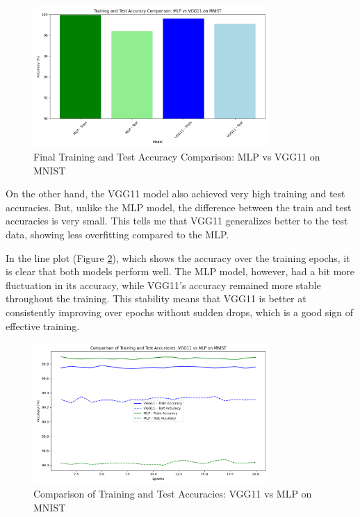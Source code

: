 \documentclass[10pt,letter,notitlepage]{article}
\begin{document}
\begin{center}
\begin{figure}[H]
    \centering
    \includegraphics[width=0.8\textwidth]{mlp_vs_vgg11_train_test_accuracy_comparison.png}
    \caption{Final Training and Test Accuracy Comparison: MLP vs VGG11 on MNIST}
    \label{fig:mlp_vgg11_comparison}
\end{figure}

On the other hand, the VGG11 model also achieved very high training and test accuracies. But, unlike the MLP model, the difference between the train and test accuracies is very small. This tells me that VGG11 generalizes better to the test data, showing less overfitting compared to the MLP.

In the line plot (Figure \ref{fig:vgg11_mlp_accuracy}), which shows the accuracy over the training epochs, it is clear that both models perform well. The MLP model, however, had a bit more fluctuation in its accuracy, while VGG11's accuracy remained more stable throughout the training. This stability means that VGG11 is better at consistently improving over epochs without sudden drops, which is a good sign of effective training.

\begin{figure}[H]
    \centering
    \includegraphics[width=0.8\textwidth]{vgg11_vs_mlp_accuracy.png}
    \caption{Comparison of Training and Test Accuracies: VGG11 vs MLP on MNIST}
    \label{fig:vgg11_mlp_accuracy}
\end{figure}


\end{center}
\end{document}
